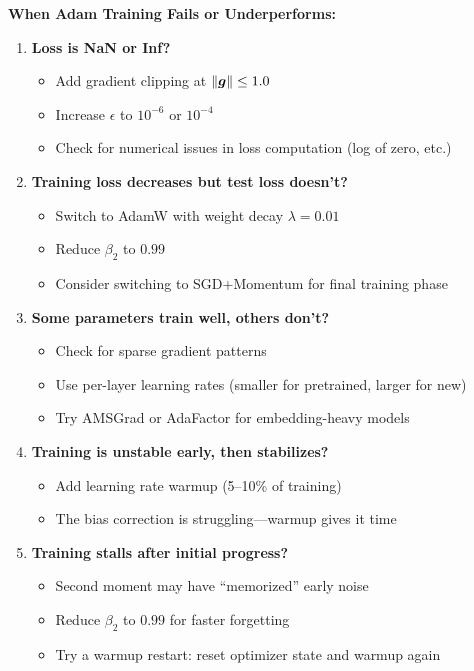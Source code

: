 \documentclass[../../main.tex]{subfiles}
\begin{document}
\begin{principle}
\textbf{When Adam Training Fails or Underperforms:}

\begin{enumerate}
    \item \textbf{Loss is NaN or Inf?}
    \begin{itemize}
        \item Add gradient clipping at $\left\lVert \boldsymbol{g} \right\rVert \leq 1.0$
        \item Increase $\epsilon$ to $10^{-6}$ or $10^{-4}$
        \item Check for numerical issues in loss computation (log of zero, etc.)
    \end{itemize}

    \item \textbf{Training loss decreases but test loss doesn't?}
    \begin{itemize}
        \item Switch to AdamW with weight decay $\lambda = 0.01$
        \item Reduce $\beta_2$ to $0.99$
        \item Consider switching to SGD+Momentum for final training phase
    \end{itemize}

    \item \textbf{Some parameters train well, others don't?}
    \begin{itemize}
        \item Check for sparse gradient patterns
        \item Use per-layer learning rates (smaller for pretrained, larger for new)
        \item Try AMSGrad or AdaFactor for embedding-heavy models
    \end{itemize}

    \item \textbf{Training is unstable early, then stabilizes?}
    \begin{itemize}
        \item Add learning rate warmup (5--10\% of training)
        \item The bias correction is struggling---warmup gives it time
    \end{itemize}

    \item \textbf{Training stalls after initial progress?}
    \begin{itemize}
        \item Second moment may have ``memorized'' early noise
        \item Reduce $\beta_2$ to $0.99$ for faster forgetting
        \item Try a warmup restart: reset optimizer state and warmup again
    \end{itemize}
\end{enumerate}
\end{principle}
\end{document}
